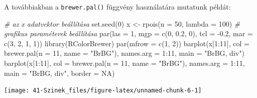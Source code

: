 \documentclass[
]{book}
\newenvironment{Shaded}{\begin{snugshade}}{\end{snugshade}}
\newcommand{\AttributeTok}[1]{\textcolor[rgb]{0.77,0.63,0.00}{#1}}
\newcommand{\CommentTok}[1]{\textcolor[rgb]{0.56,0.35,0.01}{\textit{#1}}}
\newcommand{\ConstantTok}[1]{\textcolor[rgb]{0.00,0.00,0.00}{#1}}
\newcommand{\DecValTok}[1]{\textcolor[rgb]{0.00,0.00,0.81}{#1}}
\newcommand{\FloatTok}[1]{\textcolor[rgb]{0.00,0.00,0.81}{#1}}
\newcommand{\FunctionTok}[1]{\textcolor[rgb]{0.00,0.00,0.00}{#1}}
\newcommand{\NormalTok}[1]{#1}
\newcommand{\OtherTok}[1]{\textcolor[rgb]{0.56,0.35,0.01}{#1}}
\newcommand{\SpecialCharTok}[1]{\textcolor[rgb]{0.00,0.00,0.00}{#1}}
\newcommand{\StringTok}[1]{\textcolor[rgb]{0.31,0.60,0.02}{#1}}
\begin{document}
A továbbiakban a \texttt{brewer.pal()} függvény használatára mutatunk példát:

\begin{Shaded}
\begin{Highlighting}[]
\CommentTok{\# az x adatvektor beállítása}
\FunctionTok{set.seed}\NormalTok{(}\DecValTok{0}\NormalTok{)}
\NormalTok{x }\OtherTok{\textless{}{-}} \FunctionTok{rpois}\NormalTok{(}\AttributeTok{n =} \DecValTok{50}\NormalTok{, }\AttributeTok{lambda =} \DecValTok{100}\NormalTok{)}
\CommentTok{\# grafikus paraméterek beállítása}
\FunctionTok{par}\NormalTok{(}\AttributeTok{las =} \DecValTok{1}\NormalTok{, }\AttributeTok{mgp =} \FunctionTok{c}\NormalTok{(}\DecValTok{0}\NormalTok{, }\FloatTok{0.2}\NormalTok{, }\DecValTok{0}\NormalTok{), }\AttributeTok{tcl =} \SpecialCharTok{{-}}\FloatTok{0.2}\NormalTok{, }\AttributeTok{mar =} \FunctionTok{c}\NormalTok{(}\DecValTok{3}\NormalTok{, }\DecValTok{2}\NormalTok{, }\DecValTok{1}\NormalTok{, }\DecValTok{1}\NormalTok{))}
\FunctionTok{library}\NormalTok{(RColorBrewer)}
\FunctionTok{par}\NormalTok{(}\AttributeTok{mfrow =} \FunctionTok{c}\NormalTok{(}\DecValTok{1}\NormalTok{, }\DecValTok{2}\NormalTok{))}
\FunctionTok{barplot}\NormalTok{(x[}\DecValTok{1}\SpecialCharTok{:}\DecValTok{11}\NormalTok{], }\AttributeTok{col =} \FunctionTok{brewer.pal}\NormalTok{(}\AttributeTok{n =} \DecValTok{11}\NormalTok{, }\AttributeTok{name =} \StringTok{"BrBG"}\NormalTok{), }\AttributeTok{names.arg =} \DecValTok{1}\SpecialCharTok{:}\DecValTok{11}\NormalTok{, }
    \AttributeTok{main =} \StringTok{"BrBG, div"}\NormalTok{)}
\FunctionTok{barplot}\NormalTok{(x[}\DecValTok{1}\SpecialCharTok{:}\DecValTok{11}\NormalTok{], }\AttributeTok{col =} \FunctionTok{brewer.pal}\NormalTok{(}\AttributeTok{n =} \DecValTok{11}\NormalTok{, }\AttributeTok{name =} \StringTok{"BrBG"}\NormalTok{), }\AttributeTok{names.arg =} \DecValTok{1}\SpecialCharTok{:}\DecValTok{11}\NormalTok{, }
    \AttributeTok{main =} \StringTok{"BrBG, div"}\NormalTok{, }\AttributeTok{border =} \ConstantTok{NA}\NormalTok{)}
\end{Highlighting}
\end{Shaded}

\begin{center}\texttt{[image: 41-Szinek\_files/figure-latex/unnamed-chunk-6-1]} \end{center}
\end{document}
